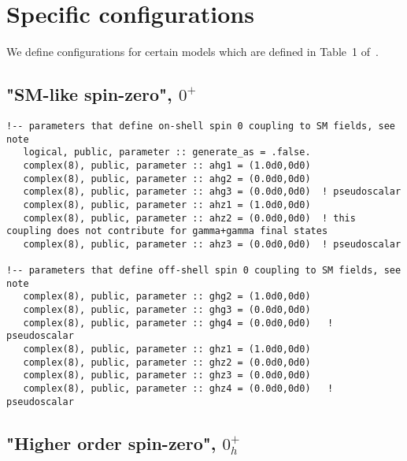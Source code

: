 \documentclass[aps,superscriptaddress,nofootinbib]{revtex4}
\begin{document}
\clearpage
\appendix


\section{Specific configurations}

We define configurations for certain models which are defined in Table~1 of~\cite{Bolognesi:2012}.

\subsection{"SM-like spin-zero", $0^+$}

\footnotesize
\begin{verbatim}
!-- parameters that define on-shell spin 0 coupling to SM fields, see note
   logical, public, parameter :: generate_as = .false.
   complex(8), public, parameter :: ahg1 = (1.0d0,0d0)
   complex(8), public, parameter :: ahg2 = (0.0d0,0d0)
   complex(8), public, parameter :: ahg3 = (0.0d0,0d0)  ! pseudoscalar
   complex(8), public, parameter :: ahz1 = (1.0d0,0d0)
   complex(8), public, parameter :: ahz2 = (0.0d0,0d0)  ! this coupling does not contribute for gamma+gamma final states
   complex(8), public, parameter :: ahz3 = (0.0d0,0d0)  ! pseudoscalar

!-- parameters that define off-shell spin 0 coupling to SM fields, see note
   complex(8), public, parameter :: ghg2 = (1.0d0,0d0)
   complex(8), public, parameter :: ghg3 = (0.0d0,0d0)
   complex(8), public, parameter :: ghg4 = (0.0d0,0d0)   ! pseudoscalar
   complex(8), public, parameter :: ghz1 = (1.0d0,0d0)
   complex(8), public, parameter :: ghz2 = (0.0d0,0d0)
   complex(8), public, parameter :: ghz3 = (0.0d0,0d0)
   complex(8), public, parameter :: ghz4 = (0.0d0,0d0)   ! pseudoscalar
\end{verbatim}
\normalsize

\subsection{"Higher order spin-zero", $0_h^+$}
\end{document}
